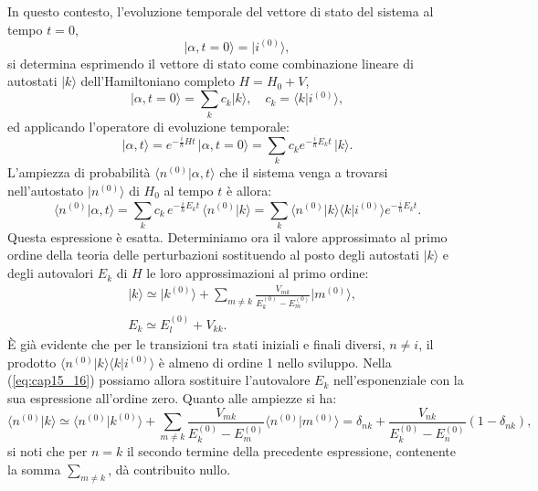 In questo contesto, l'evoluzione temporale del vettore di stato del sistema al tempo $t=0$,
	\begin{equation}
		\vert \alpha , t=0 \rangle = \vert i^{(0)} \rangle ,
	\end{equation}
si determina esprimendo il vettore di stato come combinazione lineare di autostati $\vert k \rangle $ dell'Hamiltoniano completo $H=H_0 +V$,
	\begin{equation}
	\vert \alpha , t=0\rangle = \sum _k c_k \vert k \rangle , \quad c_k = \langle k \vert i^{(0)} \rangle ,
	\end{equation}
ed applicando l'operatore di evoluzione temporale:
	\begin{equation}
		\vert \alpha , t \rangle = e^{-\frac{i}{\hbar} H t}\, \vert \alpha , t=0\rangle = \sum _k c_k e^{-\frac{i}{\hbar} E_k t }\, \vert k \rangle .
	\end{equation}
L'ampiezza di probabilità $\langle n^{(0)} \vert \alpha , t \rangle $ che il sistema venga a trovarsi nell'autostato $\vert n^{(0)} \rangle $ di $H_0$ al tempo $t$ è allora:
	\begin{equation}
		\langle n^{(0)} \vert \alpha , t \rangle = \sum _k  c_k\, e^{-\frac{i}{\hbar} E_k t}\, \langle n^{(0)} \vert k \rangle = \sum _k \langle n^{(0)} \vert k \rangle \langle k \vert i^{(0)} \rangle e^{-\frac{i}{\hbar}E_k t}.
	\label{eq:cap15_16}
	\end{equation}
Questa espressione è esatta. Determiniamo ora il valore approssimato al primo ordine della teoria delle perturbazioni sostituendo al posto degli autostati $\vert k \rangle $ e degli autovalori $E_k$ di $H$ le loro approssimazioni al primo ordine:
	\begin{align}
		&\vert k \rangle \simeq \vert k^{(0)} \rangle + \sum _{m\neq k} \frac{V_{mk}}{E_k ^{(0)} - E_m ^{(0)}}\vert m ^{(0)} \rangle ,\\
	 	&E_k \simeq E_l ^{(0)} +V_{kk} .
	\end{align}
È già evidente che per le transizioni tra stati iniziali e finali diversi, $n\neq i$, il prodotto $\langle n^{(0)} \vert k \rangle \langle k \vert i^{(0)} \rangle$ è almeno di ordine 1 nello sviluppo. Nella (\ref{eq:cap15_16}) possiamo allora sostituire l'autovalore $E_k$ nell'esponenziale con la sua espressione all'ordine zero. Quanto alle ampiezze si ha:
	\begin{equation}
		\langle n^{(0)} \vert k \rangle \simeq \langle n^{(0)} \vert k^{(0)} \rangle + \sum _{m\neq k} \frac{V_{mk}}{E_k ^{(0)}-E_m ^{(0)}} \langle n^{(0)} \vert m^{(0)} \rangle = \delta _{nk} + \frac{V_{nk}}{E_k ^{(0)} - E_n ^{(0)}}\left( 1-\delta _{nk} \right),
	\label{eq:cap15_17}	
	\end{equation}
si noti che per $n=k$ il secondo termine della precedente espressione, contenente la somma $\displaystyle{\sum _{m\neq k }}$, dà contribuito nullo.\\

